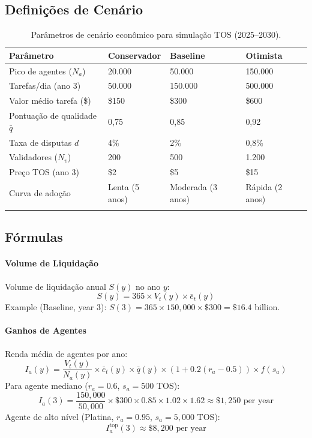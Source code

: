 \documentclass[11pt]{article}
\begin{document}
\begin{itemize}[noitemsep]
\begin{itemize}[noitemsep]
\begin{itemize}[noitemsep]
\subsection{Definições de Cenário}
\begin{longtable}{@{}p{}p{}p{}p{}@{}}
\toprule
\textbf{Parâmetro} & \textbf{Conservador} & \textbf{Baseline} & \textbf{Otimista} \\\midrule
Pico de agentes ($N_a$) & 20.000 & 50.000 & 150.000 \\
Tarefas/dia (ano 3) & 50.000 & 150.000 & 500.000 \\
Valor médio tarefa (\$) & \$150 & \$300 & \$600 \\
Pontuação de qualidade $\bar{q}$ & 0,75 & 0,85 & 0,92 \\
Taxa de disputas $d$ & 4\% & 2\% & 0,8\% \\
Validadores ($N_v$) & 200 & 500 & 1.200 \\
Preço TOS (ano 3) & \$2 & \$5 & \$15 \\
Curva de adoção & Lenta (5 anos) & Moderada (3 anos) & Rápida (2 anos) \\\bottomrule
\caption{Parâmetros de cenário econômico para simulação TOS (2025--2030).}
\label{tab:econ-scenarios}
\end{longtable}

\subsection{Fórmulas}
\paragraph{Volume de Liquidação} Volume de liquidação anual $S(y)$ no ano $y$:
\begin{equation}
S(y) = 365 \times V_t(y) \times \bar{e}_t(y)
\end{equation}
Example (Baseline, year 3): $S(3) = 365 \times 150{,}000 \times \$300 = \$16.4$ billion.

\paragraph{Ganhos de Agentes} Renda média de agentes por ano:
\begin{equation}
I_a(y) = \frac{V_t(y)}{N_a(y)} \times \bar{e}_t(y) \times \bar{q}(y) \times (1 + 0.2(r_a - 0.5)) \times f(s_a)
\end{equation}
Para agente mediano ($r_a = 0.6$, $s_a = 500$ TOS):
\begin{equation}
I_a(3) = \frac{150{,}000}{50{,}000} \times \$300 \times 0.85 \times 1.02 \times 1.62 \approx \$1{,}250 \text{ per year}
\end{equation}
Agente de alto nível (Platina, $r_a = 0.95$, $s_a = 5{,}000$ TOS):
\begin{equation}
I_a^{\text{top}}(3) \approx \$8{,}200 \text{ per year}
\end{equation}


\end{itemize}
\end{itemize}
\end{itemize}
\end{document}
